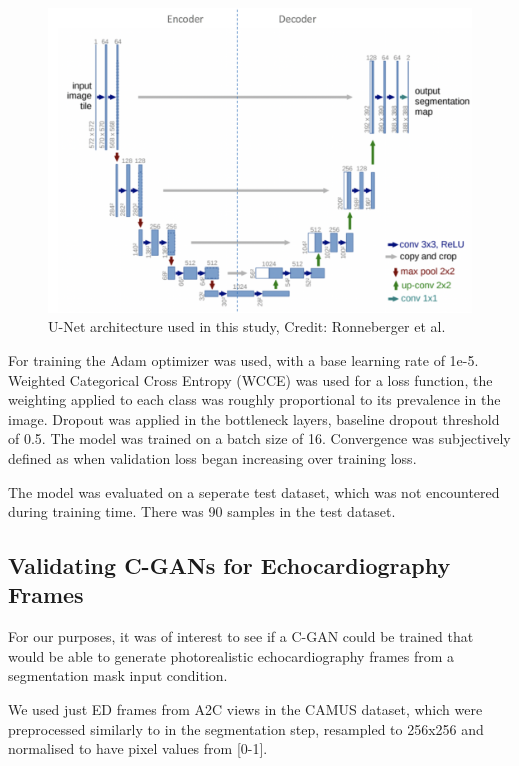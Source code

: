 \begin{figure}[H]
    \centering
    \includegraphics[width=1.0\textwidth]{figures/unet.png}
    \caption{U-Net architecture used in this study, Credit: Ronneberger et al. \cite{ronneberger2015u}}
    \label{fig:unet}
\end{figure}


For training the Adam optimizer was used, with a base learning rate of 1e-5.
Weighted Categorical Cross Entropy (WCCE) was used for a loss function, the
weighting applied to each class was roughly proportional to its prevalence in
the image. Dropout was applied in the bottleneck layers, baseline dropout
threshold of 0.5. The model was trained on a batch size of 16. Convergence
was subjectively defined as when validation loss began increasing
over training loss. \newline

The model was evaluated on a seperate test dataset, which was not encountered
during training time. There was 90 samples in the test dataset. \newline

\subsection{Validating C-GANs for Echocardiography Frames}

For our purposes, it was of interest to see if a C-GAN could be trained that
would be able to generate photorealistic echocardiography frames from a
segmentation mask input condition. \newline

We used just ED frames from A2C views in the CAMUS dataset, which were
preprocessed similarly to in the segmentation step, resampled to 256x256 and
normalised to have pixel values from [0-1]. \newline

